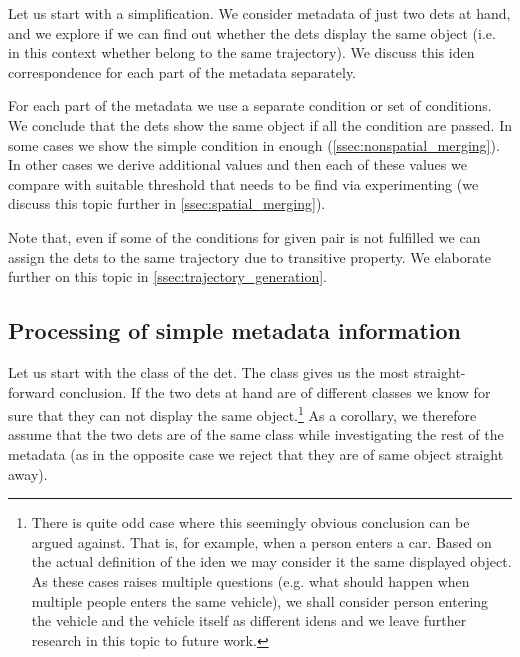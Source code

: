 
Let us start with a simplification. We consider metadata of just two \glspl{det} at hand, and we explore if we can find out whether the \glspl{det} display the same object (i.e. in this context whether belong to the same trajectory). We discuss this \gls{iden} correspondence for each part of the metadata separately.

For each part of the metadata we use a separate condition or set of conditions. We conclude that the \glspl{det} show the same object if all the condition are passed. In some cases we show the simple condition in enough (\autoref{ssec:nonspatial_merging}). In other cases we derive additional values and then each of these values we compare with suitable threshold that needs to be find via experimenting (we discuss this topic further in \autoref{ssec:spatial_merging}).

Note that, even if some of the conditions for given pair is not fulfilled we can assign the \glspl{det} to the same trajectory due to transitive property. We elaborate further on this topic in \autoref{ssec:trajectory_generation}.

\subsection{Processing of simple metadata information}

\label{ssec:nonspatial_merging}

Let us start with the class of the \gls{det}. The class
gives us the most straight-forward conclusion.
If the two \glspl{det} at hand are of different classes we know for sure
that they can not display the same
object.\footnote{There is quite
odd case where this seemingly obvious conclusion can be argued against. That
is, for example, when a person enters a car. Based on the actual definition of
the \gls{iden} we may consider it the same displayed object. As these cases
raises multiple questions (e.g. what should happen when multiple people enters the same vehicle), we shall
consider person entering the vehicle and the vehicle itself as different
\glspl{iden} and we leave further research in this topic to
future work.} As a corollary, we therefore assume that the two \glspl{det} are
of the same class while investigating the rest of the metadata (as in the
opposite case we reject that they are of same object straight away).

